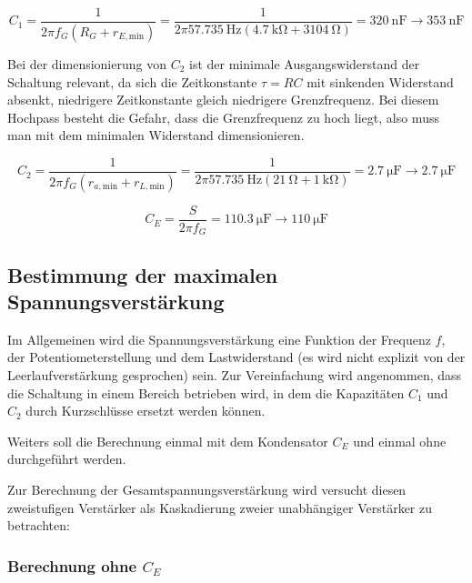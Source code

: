 \begin{equation*}
    C_1 = \frac{1}{2 \pi f_G \left( R_G + r_{E,\text{min}} \right)} = \frac{1}{2 \pi \SI{57.735}{\hertz} \left(\SI{4.7}{\kilo \ohm} +  \SI{3104}{\ohm}\right)} = \SI{320}{\nano \farad} \rightarrow \SI{353}{\nano \farad}
\end{equation*}

Bei der dimensionierung von $C_2$ ist der minimale Ausgangswiderstand der Schaltung relevant, da sich die Zeitkonstante $\tau = RC$ mit sinkenden Widerstand absenkt, niedrigere Zeitkonstante gleich niedrigere Grenzfrequenz. Bei diesem Hochpass besteht die Gefahr, dass die Grenzfrequenz zu hoch liegt, also muss man mit dem minimalen Widerstand dimensionieren.

\begin{equation*}
    C_2 = \frac{1}{2 \pi f_G \left( r_{a,\text{min}} + r_{L,\text{min}} \right)} = \frac{1}{2 \pi \SI{57.735}{\hertz} \left(\SI{21}{\ohm} +  \SI{1}{\kilo \ohm}\right)} = \SI{2.7}{\micro \farad} \rightarrow \SI{2.7}{\micro \farad}
\end{equation*}

\begin{equation*}
    C_E = \frac{S}{2 \pi f_G} = \SI{110.3}{\micro \farad} \rightarrow \SI{110}{\micro \farad}
\end{equation*}

\subsection{Bestimmung der maximalen Spannungsverstärkung}

Im Allgemeinen wird die Spannungsverstärkung eine Funktion der Frequenz $f$, der Potentiometerstellung und dem Lastwiderstand (es wird nicht explizit von der Leerlaufverstärkung gesprochen) sein.
Zur Vereinfachung wird angenommen, dass die Schaltung in einem Bereich betrieben wird, in dem die Kapazitäten $C_1$ und $C_2$ durch Kurzschlüsse ersetzt werden können.

Weiters soll die Berechnung einmal mit dem Kondensator $C_E$ und einmal ohne durchgeführt werden.

Zur Berechnung der Gesamtspannungsverstärkung wird versucht diesen zweistufigen Verstärker als Kaskadierung zweier unabhängiger Verstärker zu betrachten: 

\subsubsection{Berechnung ohne $C_E$}


